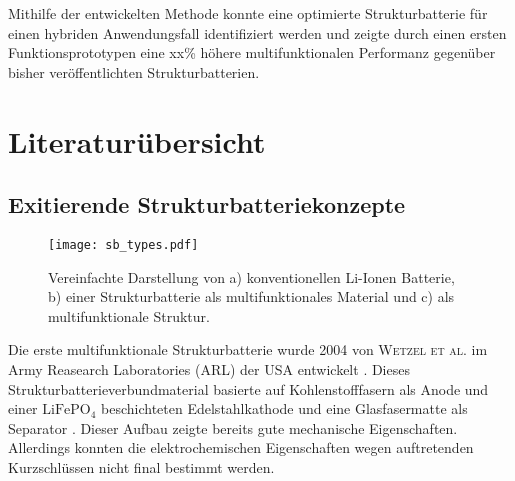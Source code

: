 Mithilfe der entwickelten Methode konnte eine optimierte  Strukturbatterie für einen hybriden Anwendungsfall identifiziert werden und zeigte durch einen ersten Funktionsprototypen eine xx\% höhere multifunktionalen Performanz gegenüber bisher veröffentlichten Strukturbatterien.



\section{\label{sec:Literaturübersicht}Literaturübersicht}

\subsection{Exitierende Strukturbatteriekonzepte}

\begin{figure}[h]
        \center
	\texttt{[image: sb\_types.pdf]}
		\caption{\label{fig:sb_types}Vereinfachte Darstellung von a) konventionellen Li-Ionen Batterie, b) einer Strukturbatterie als multifunktionales Material und c) als multifunktionale Struktur.}
\end{figure}

Die erste multifunktionale Strukturbatterie wurde 2004 von \textsc{Wetzel et al.} im Army Reasearch Laboratories (ARL) der USA entwickelt \cite{Wetzel2004, Snyder2006, Wong2007, Snyder2007}. Dieses Strukturbatterieverbundmaterial basierte auf Kohlenstofffasern als Anode und einer $\text{LiFePO}_\text{4}$ beschichteten Edelstahlkathode und eine Glasfasermatte als Separator \cite{Wong2007}. Dieser Aufbau zeigte bereits gute mechanische Eigenschaften. Allerdings konnten die elektrochemischen Eigenschaften wegen auftretenden Kurzschlüssen nicht final bestimmt werden.

